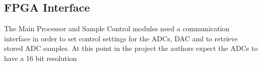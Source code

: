 \subsection{FPGA Interface} \label{subsec:FPGAInterface}
The Main Processor and Sample Control modules need a communication interface in order to set control settings for the ADCs, DAC and to retrieve stored ADC samples. At this point in the project the authors expect the ADCs to have a 16 bit resolution